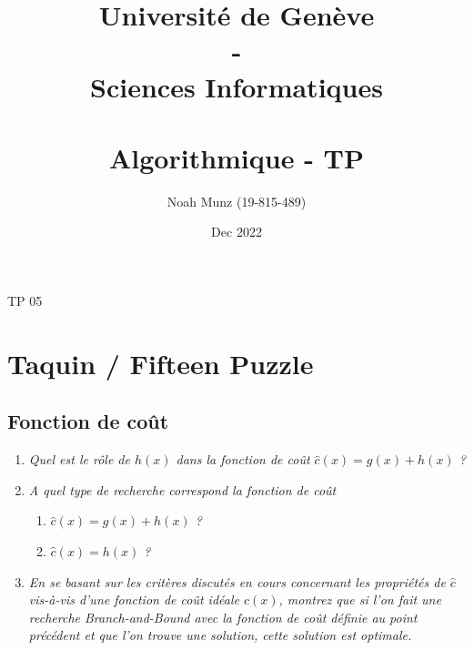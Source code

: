 \documentclass[french]{article}
\title{\vspace{-2cm}
   {\huge Université de Genève \\ - \\ Sciences Informatiques} \\
    \vspace{0.6cm}
    \unilogo{0.38} \\ 
    \vspace{1.1cm}
    {\huge Algorithmique - TP \nb}
    \vspace{0.1cm}
}
\author{Noah Munz (19-815-489)}
\date{Dec 2022}
\newcommand{\nb}{05}
\begin{document}
%
\maketitle
\vspace{0.5cm}
\tableofcontents
\thispagestyle{empty}
\clearpage
\setcounter{page}{1}
%
%
\begin{center}
	{\huge TP \nb}
\end{center}
\vspace{0.3cm}
%
\section{Taquin / Fifteen Puzzle}

\subsection{Fonction de coût}
\vspace{0.4cm}


\begin{enumerate}[label=(\alph*)]
	\item \textit{Quel est le rôle de $h(x)$ dans la fonction de coût $\hat{c}(x) = g(x) + h(x)$ ?}
	\item \textit{A quel type de recherche correspond la fonction de coût}
	\begin{enumerate}[label=\arabic*)]
		\item \textit{$\hat{c}(x) = g(x) + h(x)$ ?}
		\item \textit{$\hat{c}(x) = h(x)$ ?}
	\end{enumerate}
	\item  \textit{En se basant sur les critères discutés en cours concernant les propriétés de $\hat{c}$
	vis-à-vis d'une fonction de coût idéale $c(x)$, montrez que si l'on fait une recherche Branch-and-Bound 
	avec la fonction de coût définie au point précédent et que l'on trouve une solution, cette solution est optimale.}\\
\end{enumerate}
\end{document}
